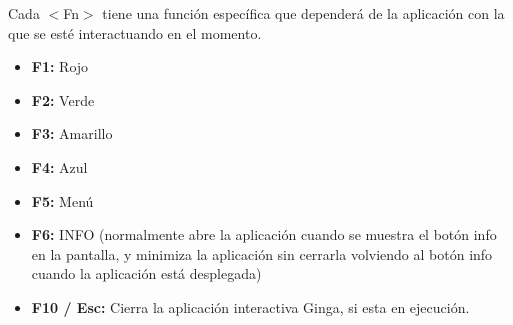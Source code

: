 \documentclass{article}
\begin{document}
Cada $<$Fn$>$ tiene una función específica que dependerá de la aplicación con la que se esté interactuando en el momento.
\begin{itemize}
	\item \textbf{F1:} Rojo
	\item \textbf{F2:} Verde
	\item \textbf{F3:} Amarillo
	\item \textbf{F4:} Azul
	\item \textbf{F5:} Menú
	\item \textbf{F6:} INFO (normalmente abre la aplicación cuando se muestra el botón info en la pantalla, y 	minimiza la aplicación sin cerrarla volviendo al botón info cuando la aplicación está desplegada)
	\item \textbf{F10 / Esc:} Cierra la aplicación interactiva Ginga, si esta en ejecución.
\end{itemize}
\end{document}
